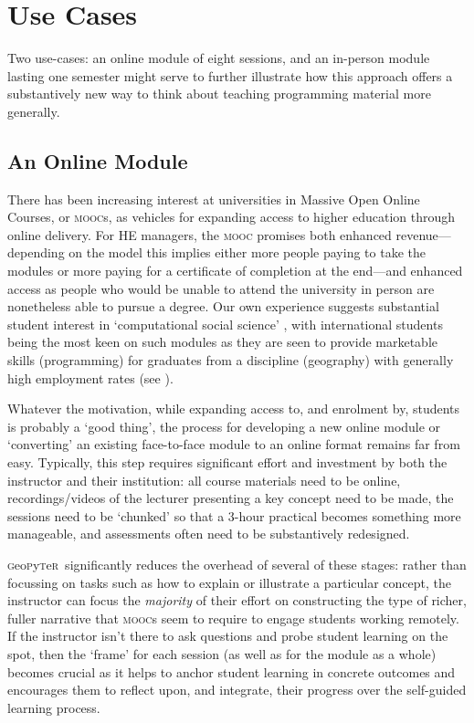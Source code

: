 \documentclass[letter, 11pt]{article}
\newcommand{\gp}{\textsc{g}eo\textsc{p}y\textsc{t}e\textsc{r}~\/}
\begin{document}
\section{Use Cases}\label{uses}

Two use-cases: an online module of eight sessions, and an in-person module lasting one semester might serve to further illustrate how this approach offers a substantively new way to think about teaching programming material more generally.

\subsection{An Online Module}\label{an-online-module}

There has been increasing interest at universities in Massive Open Online Courses, or \textsc{mooc}s, as vehicles for expanding access to higher education through online delivery. For HE managers, the \textsc{mooc} promises both enhanced revenue---depending on the model this implies either more people paying to take the modules or more paying for a certificate of completion at the end---and enhanced access as people who would be unable to attend the university in person are nonetheless able to pursue a degree. Our own experience suggests substantial student interest in `computational social science' \citep{Lazer2009}, with international students being the most keen on such modules as they are seen to provide marketable skills (programming) for graduates from a discipline (geography) with generally high employment rates (see \citeauthor{rgs2017} \citeyear{rgs2017}).

Whatever the motivation, while expanding access to, and enrolment by, students is probably a `good thing', the process for developing a new online module or `converting' an existing face-to-face module to an online format remains far from easy. Typically, this step requires significant effort and investment by both the instructor and their  institution: all course materials need to be online, recordings/videos of the lecturer presenting a key concept need to be made, the sessions need to be `chunked' so that a 3-hour practical becomes something more manageable, and assessments often need to be substantively redesigned.

\gp significantly reduces the overhead of several of these stages: rather than focussing on tasks such as how to explain or illustrate a particular concept, the instructor can focus the \emph{majority} of their effort on constructing the type of richer, fuller narrative that \textsc{mooc}s seem to require to engage students working remotely. If the instructor isn't there to ask questions and probe student learning on the spot, then the `frame' for each session (as well as for the module as a whole) becomes crucial as it helps to anchor student learning in concrete outcomes and encourages them to reflect upon, and integrate, their progress over the self-guided learning process.
\end{document}
